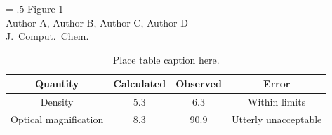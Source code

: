 \documentclass[12pt]{article}
\begin{document}




\clearpage

\vspace{0.25in}
\hspace*{3in}
{\Large
\begin{minipage}[t]{3in}
\baselineskip = .5\baselineskip
Figure 1 \\
Author A, Author B, Author C, Author D \\
J.\ Comput.\ Chem.
\end{minipage}
}

\clearpage

\begin{table}
\begin{tabular}{|c|c|c|c|}\hline
\textbf{Quantity} & \textbf{Calculated} & \textbf{Observed} & \textbf{Error} \\ \hline
  Density & 5.3 & 6.3 & Within limits \\ \hline
  Optical magnification & 8.3 & 90.9 & Utterly unacceptable\! \\ \hline
\end{tabular}
\caption{\label{tbl1} Place table caption here.}
\end{table}
\end{document}
